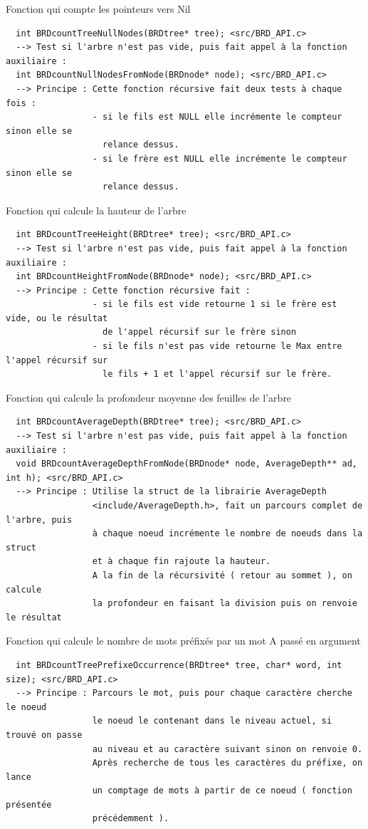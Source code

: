 \documentclass[a4paper,8pt]{report}
\begin{document}
Fonction qui compte les pointeurs vers Nil
\begin{verbatim}
  int BRDcountTreeNullNodes(BRDtree* tree); <src/BRD_API.c>
  --> Test si l'arbre n'est pas vide, puis fait appel à la fonction auxiliaire :
  int BRDcountNullNodesFromNode(BRDnode* node); <src/BRD_API.c>
  --> Principe : Cette fonction récursive fait deux tests à chaque fois :
                 - si le fils est NULL elle incrémente le compteur sinon elle se
                   relance dessus.
                 - si le frère est NULL elle incrémente le compteur sinon elle se
                   relance dessus.
\end{verbatim}
Fonction qui calcule la hauteur de l'arbre
\begin{verbatim}
  int BRDcountTreeHeight(BRDtree* tree); <src/BRD_API.c>
  --> Test si l'arbre n'est pas vide, puis fait appel à la fonction auxiliaire :
  int BRDcountHeightFromNode(BRDnode* node); <src/BRD_API.c>
  --> Principe : Cette fonction récursive fait :
                 - si le fils est vide retourne 1 si le frère est vide, ou le résultat
                   de l'appel récursif sur le frère sinon
                 - si le fils n'est pas vide retourne le Max entre l'appel récursif sur
                   le fils + 1 et l'appel récursif sur le frère.
\end{verbatim}
Fonction qui calcule la profondeur moyenne des feuilles de l'arbre
\begin{verbatim}
  int BRDcountAverageDepth(BRDtree* tree); <src/BRD_API.c>
  --> Test si l'arbre n'est pas vide, puis fait appel à la fonction auxiliaire :
  void BRDcountAverageDepthFromNode(BRDnode* node, AverageDepth** ad, int h); <src/BRD_API.c>
  --> Principe : Utilise la struct de la librairie AverageDepth
                 <include/AverageDepth.h>, fait un parcours complet de l'arbre, puis
                 à chaque noeud incrémente le nombre de noeuds dans la struct
                 et à chaque fin rajoute la hauteur.
                 A la fin de la récursivité ( retour au sommet ), on calcule
                 la profondeur en faisant la division puis on renvoie le résultat
\end{verbatim}
Fonction qui calcule le nombre de mots préfixés par un mot A passé en argument
\begin{verbatim}
  int BRDcountTreePrefixeOccurrence(BRDtree* tree, char* word, int size); <src/BRD_API.c>
  --> Principe : Parcours le mot, puis pour chaque caractère cherche le noeud
                 le noeud le contenant dans le niveau actuel, si trouvé on passe
                 au niveau et au caractère suivant sinon on renvoie 0.
                 Après recherche de tous les caractères du préfixe, on lance
                 un comptage de mots à partir de ce noeud ( fonction présentée 
                 précédemment ).
\end{verbatim}
\end{document}
